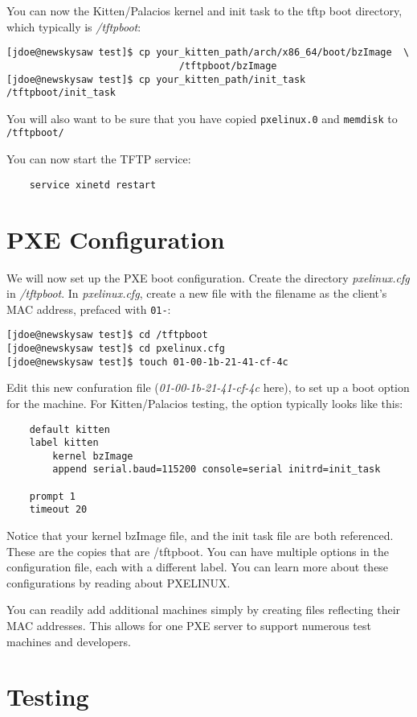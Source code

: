 \documentclass[11pt]{article}
\begin{document}
You can now the Kitten/Palacios kernel and init task to the tftp boot
directory, which typically is  {\em /tftpboot}:
\begin{verbatim}
[jdoe@newskysaw test]$ cp your_kitten_path/arch/x86_64/boot/bzImage  \
                              /tftpboot/bzImage
[jdoe@newskysaw test]$ cp your_kitten_path/init_task /tftpboot/init_task
\end{verbatim}

You will also want to be sure that you have copied \verb!pxelinux.0!
and \verb.memdisk. to \verb./tftpboot/.  

You can now start the TFTP service:
\begin{verbatim}
    service xinetd restart
\end{verbatim}


\section{PXE Configuration}

We will now set up the PXE boot configuration.  Create the
directory {\em pxelinux.cfg} in {\em /tftpboot}.  In {\em pxelinux.cfg},
create a new file with the filename as the client's MAC
address, prefaced with \verb.01-.:
\begin{verbatim}
[jdoe@newskysaw test]$ cd /tftpboot
[jdoe@newskysaw test]$ cd pxelinux.cfg
[jdoe@newskysaw test]$ touch 01-00-1b-21-41-cf-4c
\end{verbatim}
Edit this new confuration file ({\em 01-00-1b-21-41-cf-4c} here), to
set up a boot option for the machine.   For Kitten/Palacios testing,
the option typically looks like this:
\begin{verbatim}
    default kitten
    label kitten
        kernel bzImage
        append serial.baud=115200 console=serial initrd=init_task

    prompt 1 
    timeout 20
\end{verbatim}

Notice that your kernel bzImage file, and the init task file are both
referenced.  These are the copies that are /tftpboot.  You can have
multiple options in the configuration file, each with a different
label.   You can learn more about these configurations by reading
about PXELINUX.  

You can readily add additional machines simply by creating files
reflecting their MAC addresses.   This allows for one PXE server to
support numerous test machines and developers.

\section{Testing}
\end{document}
